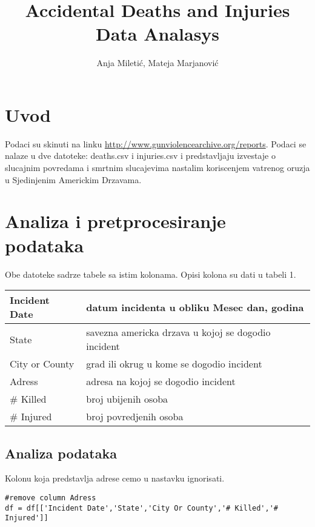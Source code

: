 \documentclass[11pt]{article} %
\title{Accidental Deaths and Injuries Data Analasys}
\author{Anja Miletić, Mateja Marjanović}
\begin{document}
\maketitle
\newpage

\doublespacing
\tableofcontents
\singlespacing
\newpage


\section{Uvod}
Podaci su skinuti na linku \url{http://www.gunviolencearchive.org/reports}. Podaci se nalaze u dve datoteke: deaths.csv i injuries.csv i predstavljaju izvestaje o 
slucajnim povredama i smrtnim slucajevima nastalim koriscenjem vatrenog oruzja u Sjedinjenim Americkim Drzavama. 

\section{Analiza i pretprocesiranje podataka}
Obe datoteke sadrze tabele sa istim kolonama. Opisi kolona su dati u tabeli 1.
\newline\newline
\begin{tabular}{|l|l|}
\hline
Incident Date & datum incidenta u obliku Mesec dan, godina \\
\hline
State & savezna americka drzava u kojoj se dogodio incident \\
\hline
City or County & grad ili okrug u kome se dogodio incident \\
\hline
Adress & adresa na kojoj se dogodio incident \\
\hline
\# Killed & broj ubijenih osoba \\
\hline
\# Injured & broj povredjenih osoba \\
\hline
\end{tabular}

\subsection{Analiza podataka}
Kolonu koja predstavlja adrese cemo u nastavku ignorisati. 
\begin{lstlisting}
#remove column Adress
df = df[['Incident Date','State','City Or County','# Killed','# Injured']]
\end{lstlisting}

	
	
\end{document}
